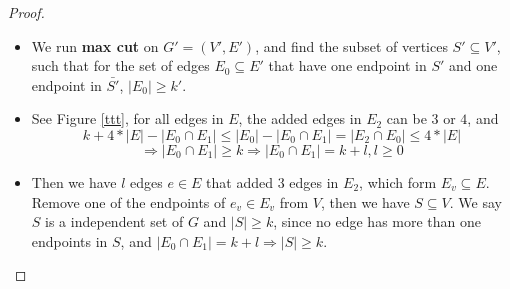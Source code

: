 \documentclass{article}
\newcommand{\<}{
    \langle}
\renewcommand{\>}{
    \rangle}
\begin{document}
{\begin{proof}
\begin{itemize}
        \item We run \textbf{max cut} on $G'=(V',E')$, and find the subset of vertices $S'\subseteq V'$, such that for the set of edges $E_0\subseteq E'$ that have one endpoint in $S'$ and one endpoint in $\bar{S'}$, $|E_0|\geq k'$.
        \item See Figure \ref{ttt}, for all edges in $E$, the added edges in $E_2$ can be $3$ or $4$, and
        \begin{displaymath}
            k+4*|E|-|E_0\cap E_1| \leq|E_0|-|E_0\cap E_1|=|E_2\cap E_0|\leq4*|E|
        \end{displaymath}
        \begin{displaymath}
            \Rightarrow |E_0\cap E_1|\geq k \Rightarrow |E_0\cap E_1|=k+l,l\geq 0 
        \end{displaymath}
        \item Then we have $l$ edges $e\in E$ that added $3$ edges in $E_2$, which form $E_v\subseteq E$. Remove one of the endpoints of $e_v\in E_v$ from $V$, then we have $S\subseteq V$. We say $S$ is a independent set of $G$ and $|S|\geq k$, since no edge has more than one endpoints in $S$, and $|E_0\cap E_1|=k+l\Rightarrow |S|\geq k$.
        
        \end{itemize}
\end{proof}

\newpage


}
\end{document}
